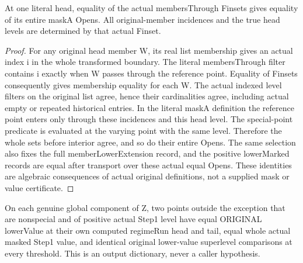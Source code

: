\begin{lemma}
\label{hir:member-across-mask-selection-whole-mask}
\leanok
{}
At one literal head, equality of the actual membersThrough Finsets gives
equality of its entire maskA Opens. All original-member incidences and the
true head levels are determined by that actual Finset.
\end{lemma}
\begin{proof}
For any original head member W, its real list membership gives an actual
index i in the whole transformed boundary. The literal membersThrough
filter contains i exactly when W passes through the reference point.
Equality of Finsets consequently gives membership equality for each W.
The actual indexed level filters on the original list agree, hence their
cardinalities agree, including actual empty or repeated historical entries.
In the literal maskA definition the reference point enters only through
these incidences and this head level. The special-point predicate is
evaluated at the varying point with the same level. Therefore the whole sets
before interior agree, and so do their entire Opens. The same selection also
fixes the full memberLowerExtension record, and the positive lowerMarked
records are equal after transport over these actual equal Opens. These
identities are algebraic consequences of actual original definitions,
not a supplied mask or value certificate.
\end{proof}

\begin{definition}
\label{hir:member-across-mask-actual-value-dictionary}
\leanok
{}
On each genuine global component of Z, two points outside the exception that
are nonspecial and of positive actual Step1 level have equal ORIGINAL
lowerValue at their own computed regimeRun head and tail, equal whole actual
masked Step1 value, and identical original lower-value superlevel comparisons
at every threshold. This is an output dictionary, never a caller hypothesis.
\end{definition}

